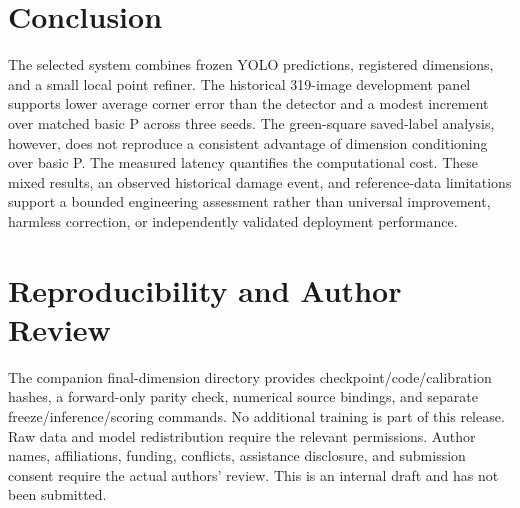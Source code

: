 \documentclass[journal]{IEEEtran}
\begin{document}
\section{Conclusion}
The selected system combines frozen YOLO predictions, registered dimensions, and a small local point refiner. The historical 319-image development panel supports lower average corner error than the detector and a modest increment over matched basic P across three seeds. The green-square saved-label analysis, however, does not reproduce a consistent advantage of dimension conditioning over basic P. The measured latency quantifies the computational cost. These mixed results, an observed historical damage event, and reference-data limitations support a bounded engineering assessment rather than universal improvement, harmless correction, or independently validated deployment performance.

\section*{Reproducibility and Author Review}
The companion final-dimension directory provides checkpoint/code/calibration hashes, a forward-only parity check, numerical source bindings, and separate freeze/inference/scoring commands. No additional training is part of this release. Raw data and model redistribution require the relevant permissions. Author names, affiliations, funding, conflicts, assistance disclosure, and submission consent require the actual authors' review. This is an internal draft and has not been submitted.


\end{document}

